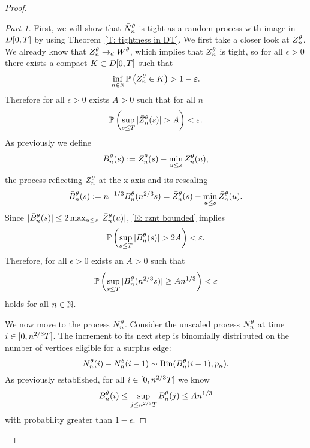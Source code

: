 \begin{proof}
\begin{proof}[Part 1]\renewcommand{\qedsymbol}{}
First, we will show that $\bar{N}_n^{\theta}$ is tight as a random process with image in $D[0, T]$ by using Theorem~\ref{T: tightness in DT}.
We first take a closer look at $\bar{Z}^{\theta}_n$.
We already know that $\bar{Z}^{\theta}_n \rightarrow_d W^{\theta}$, which implies that $\bar{Z}^{\theta}_n$ is tight, 
so for all $\epsilon>0$ there exists a compact $K \subset D[0, T]$ such that
\begin{equation*} \label{E: rznt tight}
\inf_{n \in \mathbb{N}}\mathbb{P} \left( \bar{Z}^{\theta}_n \in K\right) > 1 - \varepsilon.
\end{equation*}
Therefore for all $\epsilon > 0$ exists $A>0$ such that for all $n$
\begin{equation} \label{E: rznt bounded}
\mathbb{P}\left(\sup_{s \leq T} |\bar{Z}^{\theta}_n(s)| > A\right) < \varepsilon.
\end{equation}
As previously we define 
\begin{equation*}
	B_n^{\theta}(s) := Z_n^{\theta}(s) - \min_{u \leq s}Z_n^{\theta}(u),
\end{equation*}
the process reflecting $Z_n^{\theta}$ at the x-axis and its rescaling
\begin{equation*}
	\bar{B}_n^{\theta}(s) := n^{-1 / 3}B_n^{\theta}(n^{2 / 3}s) = \bar{Z}^{\theta}_n(s) - \min_{u \leq s}\bar{Z}^{\theta}_n(u).
\end{equation*}
Since $|\bar{B}_n^{\theta}(s)| \leq 2\max_{u \leq s}|\bar{Z}^{\theta}_n(u)|$, \eqref{E: rznt bounded} implies
\begin{equation*} \label{E: rzminz bounded}
\mathbb{P}\left(\sup_{s \leq T} |\bar{B}_n^{\theta}(s)| > 2A\right) < \varepsilon.
\end{equation*}
Therefore, for all $\epsilon > 0$ exists an $A>0$ such that
\begin{equation*}
\mathbb{P}\left( \sup_{s \leq T} |B_n^{\theta}(n^{2 / 3}s)| \geq An^{1 / 3} \right) < \varepsilon
\end{equation*}
holds for all $n \in \mathbb{N}$.

\bigskip

We now move to the process $\bar{N}_n^{\theta}$. Consider the unscaled process $N_n^{\theta}$ at time $i \in [0, n^{2 / 3}T]$.
The increment to its next step is binomially distributed on the number of vertices eligible for a surplus edge:
\begin{equation*}
N_n^{\theta}(i) - N_n^{\theta}(i-1) \sim \operatorname*{Bin}(B_n^{\theta}(i-1), p_n).
\end{equation*}
As previously established, for all $i \in [0, n^{2 / 3}T]$ we know 
\begin{equation*}
	B_n^{\theta}(i) \leq \sup_{j \leq n^{2 / 3}T} B_n^{\theta}(j) \leq An^{1 / 3}
\end{equation*}
with probability greater than $1-\epsilon$.


\end{proof}
\end{proof}
